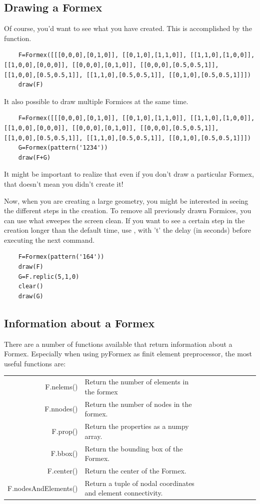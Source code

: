 \documentclass[a4paper]{manual}
\newcommand{\pyformex}{pyFormex\xspace}
\begin{document}
{\subsection{Drawing a Formex}
\label{subsec:drawing}
Of course, you'd want to see what you have created. This is accomplished by the  function. 
\begin{verbatim}
	F=Formex([[[0,0,0],[0,1,0]], [[0,1,0],[1,1,0]], [[1,1,0],[1,0,0]], [[1,0,0],[0,0,0]], [[0,0,0],[0,1,0]], [[0,0,0],[0.5,0.5,1]], 		[[1,0,0],[0.5,0.5,1]], [[1,1,0],[0.5,0.5,1]], [[0,1,0],[0.5,0.5,1]]])
	draw(F)
\end{verbatim}

It also possible to draw multiple Formices at the same time.
\begin{verbatim}
	F=Formex([[[0,0,0],[0,1,0]], [[0,1,0],[1,1,0]], [[1,1,0],[1,0,0]], [[1,0,0],[0,0,0]], [[0,0,0],[0,1,0]], [[0,0,0],[0.5,0.5,1]], 		[[1,0,0],[0.5,0.5,1]], [[1,1,0],[0.5,0.5,1]], [[0,1,0],[0.5,0.5,1]]])	
	G=Formex(pattern('1234'))
	draw(F+G)
\end{verbatim}
 
It might be important to realize that even if you don't draw a particular Formex, that doesn't mean you didn't create it!

Now, when you are creating a large geometry, you might be interested in seeing the different steps in the creation. To remove all previously drawn Formices, you can use   what sweepes the screen clean. If you want to see a certain step in the creation longer than the default time, use , with 't' the delay (in seconds) before executing the next command.
\begin{verbatim}
	F=Formex(pattern('164'))
	draw(F)
	G=F.replic(5,1,0)
	clear()
	draw(G)
\end{verbatim}


\subsection{Information about a Formex}
\label{subsec:info}
There are a number of functions available that return information about a Formex. Especially when using \pyformex as finit element preprocessor, the most useful functions are:
\begin{table}[h]
	\begin{tabular}{*{5}{rl}}
F.nelems()				& Return the number of elements in the formex\\
F.nnodes() 			& Return the number of nodes in the formex.\\
F.prop() 				& Return the properties as a numpy array.\\
F.bbox()				& Return the bounding box of the Formex.\\
F.center()				& Return the center of the Formex.\\
F.nodesAndElements() 	& Return a tuple of nodal coordinates and element connectivity.\\
	\end {tabular}
\end{table}

}
\end{document}
